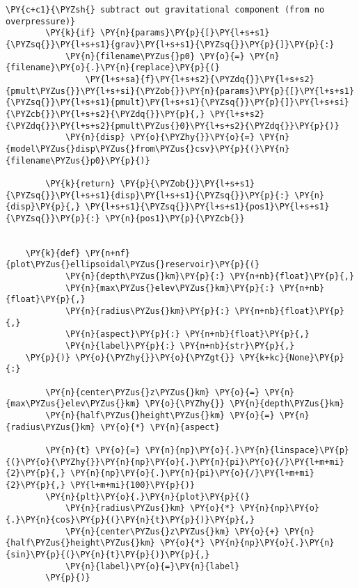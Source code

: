 \begin{tcolorbox}[breakable, size=fbox, boxrule=1pt, pad at break*=1mm,colback=cellbackground, colframe=cellborder]
\begin{Verbatim}[commandchars=\\\{\}]
        \PY{c+c1}{\PYZsh{} subtract out gravitational component (from no overpressure)}
        \PY{k}{if} \PY{n}{params}\PY{p}{[}\PY{l+s+s1}{\PYZsq{}}\PY{l+s+s1}{grav}\PY{l+s+s1}{\PYZsq{}}\PY{p}{]}\PY{p}{:}
            \PY{n}{filename\PYZus{}p0} \PY{o}{=} \PY{n}{filename}\PY{o}{.}\PY{n}{replace}\PY{p}{(}
                \PY{l+s+sa}{f}\PY{l+s+s2}{\PYZdq{}}\PY{l+s+s2}{pmult\PYZus{}}\PY{l+s+si}{\PYZob{}}\PY{n}{params}\PY{p}{[}\PY{l+s+s1}{\PYZsq{}}\PY{l+s+s1}{pmult}\PY{l+s+s1}{\PYZsq{}}\PY{p}{]}\PY{l+s+si}{\PYZcb{}}\PY{l+s+s2}{\PYZdq{}}\PY{p}{,} \PY{l+s+s2}{\PYZdq{}}\PY{l+s+s2}{pmult\PYZus{}0}\PY{l+s+s2}{\PYZdq{}}\PY{p}{)}
            \PY{n}{disp} \PY{o}{\PYZhy{}}\PY{o}{=} \PY{n}{model\PYZus{}disp\PYZus{}from\PYZus{}csv}\PY{p}{(}\PY{n}{filename\PYZus{}p0}\PY{p}{)}
    
        \PY{k}{return} \PY{p}{\PYZob{}}\PY{l+s+s1}{\PYZsq{}}\PY{l+s+s1}{disp}\PY{l+s+s1}{\PYZsq{}}\PY{p}{:} \PY{n}{disp}\PY{p}{,} \PY{l+s+s1}{\PYZsq{}}\PY{l+s+s1}{pos1}\PY{l+s+s1}{\PYZsq{}}\PY{p}{:} \PY{n}{pos1}\PY{p}{\PYZcb{}}
    
    
    \PY{k}{def} \PY{n+nf}{plot\PYZus{}ellipsoidal\PYZus{}reservoir}\PY{p}{(}
            \PY{n}{depth\PYZus{}km}\PY{p}{:} \PY{n+nb}{float}\PY{p}{,}
            \PY{n}{max\PYZus{}elev\PYZus{}km}\PY{p}{:} \PY{n+nb}{float}\PY{p}{,}
            \PY{n}{radius\PYZus{}km}\PY{p}{:} \PY{n+nb}{float}\PY{p}{,}
            \PY{n}{aspect}\PY{p}{:} \PY{n+nb}{float}\PY{p}{,}
            \PY{n}{label}\PY{p}{:} \PY{n+nb}{str}\PY{p}{,}
    \PY{p}{)} \PY{o}{\PYZhy{}}\PY{o}{\PYZgt{}} \PY{k+kc}{None}\PY{p}{:}
    
        \PY{n}{center\PYZus{}z\PYZus{}km} \PY{o}{=} \PY{n}{max\PYZus{}elev\PYZus{}km} \PY{o}{\PYZhy{}} \PY{n}{depth\PYZus{}km}
        \PY{n}{half\PYZus{}height\PYZus{}km} \PY{o}{=} \PY{n}{radius\PYZus{}km} \PY{o}{*} \PY{n}{aspect}
    
        \PY{n}{t} \PY{o}{=} \PY{n}{np}\PY{o}{.}\PY{n}{linspace}\PY{p}{(}\PY{o}{\PYZhy{}}\PY{n}{np}\PY{o}{.}\PY{n}{pi}\PY{o}{/}\PY{l+m+mi}{2}\PY{p}{,} \PY{n}{np}\PY{o}{.}\PY{n}{pi}\PY{o}{/}\PY{l+m+mi}{2}\PY{p}{,} \PY{l+m+mi}{100}\PY{p}{)}
        \PY{n}{plt}\PY{o}{.}\PY{n}{plot}\PY{p}{(}
            \PY{n}{radius\PYZus{}km} \PY{o}{*} \PY{n}{np}\PY{o}{.}\PY{n}{cos}\PY{p}{(}\PY{n}{t}\PY{p}{)}\PY{p}{,}
            \PY{n}{center\PYZus{}z\PYZus{}km} \PY{o}{+} \PY{n}{half\PYZus{}height\PYZus{}km} \PY{o}{*} \PY{n}{np}\PY{o}{.}\PY{n}{sin}\PY{p}{(}\PY{n}{t}\PY{p}{)}\PY{p}{,}
            \PY{n}{label}\PY{o}{=}\PY{n}{label}
        \PY{p}{)}
    

\end{Verbatim}
\end{tcolorbox}
